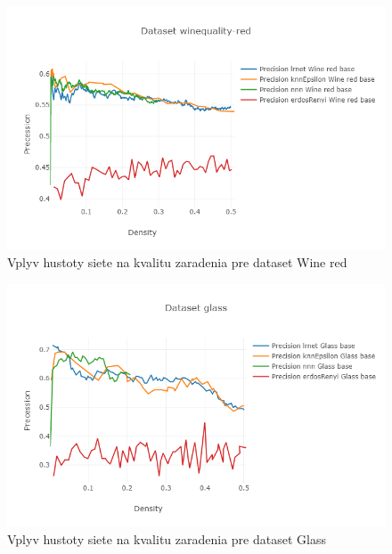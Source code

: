 \documentclass[slovak,master,dept460,male,cpp,cpdeclaration]{diploma}
\begin{document}
\begin{figure}[H]
\centering
    \includegraphics[width=\textwidth]{plot_wine_red.png}
    \caption{Vplyv hustoty siete na kvalitu zaradenia pre dataset Wine red}
\end{figure} 
\begin{figure}[H]
\centering
    \includegraphics[width=\textwidth]{plot_glass.png}
    \caption{Vplyv hustoty siete na kvalitu zaradenia pre dataset Glass}
\end{figure} 
\end{document}
